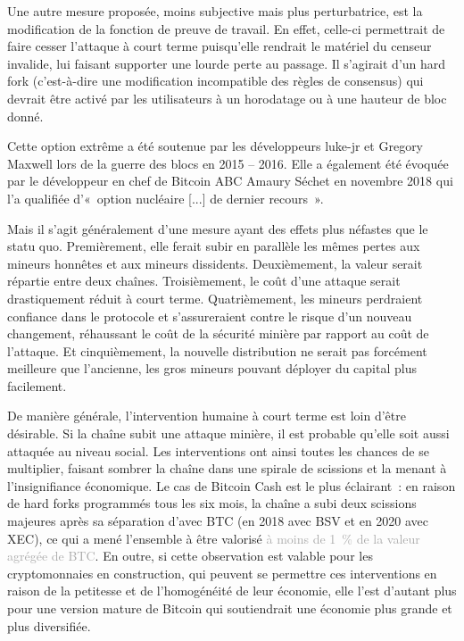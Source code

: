 
Une autre mesure proposée, moins subjective mais plus perturbatrice, est la modification de la fonction de preuve de travail. En effet, celle-ci permettrait de faire cesser l'attaque à court terme puisqu'elle rendrait le matériel du censeur invalide, lui faisant supporter une lourde perte au passage. Il s'agirait d'un hard fork (c'est-à-dire une modification incompatible des règles de consensus) qui devrait être activé par les utilisateurs à un horodatage ou à une hauteur de bloc donné.

Cette option extrême a été soutenue par les développeurs luke-jr et Gregory Maxwell lors de la guerre des blocs en 2015 -- 2016. Elle a également été évoquée par le développeur en chef de Bitcoin ABC Amaury Séchet en novembre 2018 qui l'a qualifiée d'«~option nucléaire [...] de dernier recours~».

Mais il s'agit généralement d'une mesure ayant des effets plus néfastes que le statu quo. Premièrement, elle ferait subir en parallèle les mêmes pertes aux mineurs honnêtes et aux mineurs dissidents. Deuxièmement, la valeur serait répartie entre deux chaînes. Troisièmement, le coût d'une attaque serait drastiquement réduit à court terme. Quatrièmement, les mineurs perdraient confiance dans le protocole et s'assureraient contre le risque d'un nouveau changement, réhaussant le coût de la sécurité minière par rapport au coût de l'attaque. Et cinquièmement, la nouvelle distribution ne serait pas forcément meilleure que l'ancienne, les gros mineurs pouvant déployer du capital plus facilement.

De manière générale, l'intervention humaine à court terme est loin d'être désirable. Si la chaîne subit une attaque minière, il est probable qu'elle soit aussi attaquée au niveau social. Les interventions ont ainsi toutes les chances de se multiplier, faisant sombrer la chaîne dans une spirale de scissions et la menant à l'insignifiance économique. Le cas de Bitcoin Cash est le plus éclairant~: en raison de hard forks programmés tous les six mois, la chaîne a subi deux scissions majeures après sa séparation d'avec BTC (en 2018 avec BSV et en 2020 avec XEC), ce qui a mené l'ensemble à être valorisé \textcolor{darkgray}{à moins de 1~\% de la valeur agrégée de BTC}. En outre, si cette observation est valable pour les cryptomonnaies en construction, qui peuvent se permettre ces interventions en raison de la petitesse et de l'homogénéité de leur économie, elle l'est d'autant plus pour une version mature de Bitcoin qui soutiendrait une économie plus grande et plus diversifiée.


